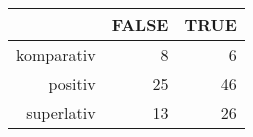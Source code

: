 \begin{tabular}{rrr}
  \hline
 & FALSE & TRUE \\ 
  \hline
komparativ & 8 & 6 \\ 
  positiv & 25 & 46 \\ 
  superlativ & 13 & 26 \\ 
   \hline
\end{tabular}
